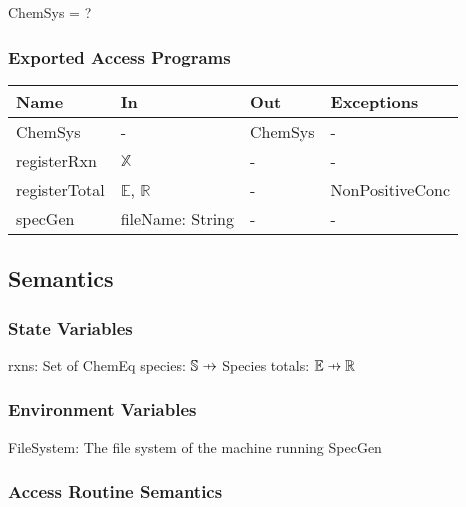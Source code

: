\documentclass[12pt, titlepage]{article}
\newcommand\pfun{\mathrel{\ooalign{\hfil$\mapstochar\mkern5mu$\hfil\cr$\to$\cr}}}
\newcommand{\progname}{SpecGen}
\begin{document}
ChemSys = ?

\subsubsection{Exported Access Programs}

\begin{center}
\begin{tabular}{p{3cm} p{3cm} p{3cm} p{3cm}}
\hline
\textbf{Name} & \textbf{In} & \textbf{Out} & \textbf{Exceptions} \\
\hline
ChemSys & - & ChemSys & - \\
registerRxn & $\mathbb{X}$ & - & - \\
registerTotal & $\mathbb{E}$, $\mathbb{R}$ & - & NonPositiveConc \\ 
specGen & fileName: String & - & - \\
\hline
\end{tabular}
\end{center}

\subsection{Semantics}

\subsubsection{State Variables}
rxns: Set of ChemEq
\newline species: $\mathbb{S} \pfun$ Species
\newline totals: $\mathbb{E} \pfun \mathbb{R}$ 

\subsubsection{Environment Variables}
FileSystem: The file system of the machine running \progname

\subsubsection{Access Routine Semantics}
\end{document}
